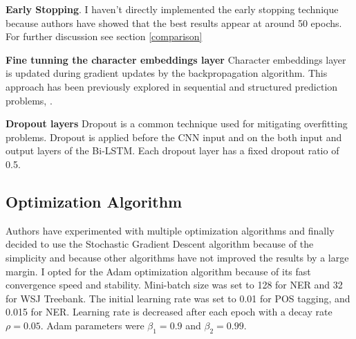 \textbf{Early Stopping}. I haven't directly implemented the early stopping
technique\cite{caruana2000overfitting} because authors have showed that the best results
appear at around 50 epochs. For further discussion see section
\ref{comparison}

\textbf{Fine tunning the character embeddings layer}
Character embeddings layer is updated during gradient updates by the
backpropagation algorithm. This approach has been previously explored in
sequential and structured prediction problems\cite{collobert2011natural},
\cite{peng2015named}.

\textbf{Dropout layers}
Dropout is a common technique used for mitigating overfitting problems.
Dropout is applied before the CNN input and on the both input and output
layers of the Bi-LSTM. Each dropout layer has a fixed dropout ratio of 0.5.

\subsection{Optimization Algorithm}
Authors have experimented with multiple optimization algorithms and finally
decided to use the Stochastic Gradient Descent algorithm because of
the simplicity and because other algorithms have not improved the results by a
large margin. I opted for the Adam optimization algorithm\cite{kingma2014adam} because of
its fast convergence speed and stability. Mini-batch size was set to 128 for
NER and 32 for WSJ Treebank. The initial learning rate was set to 0.01 for
POS tagging, and 0.015 for NER. Learning rate is decreased after each epoch
with a decay rate $\rho = 0.05$. Adam parameters were $\beta_1 = 0.9$ and
$\beta_2 = 0.99$.

